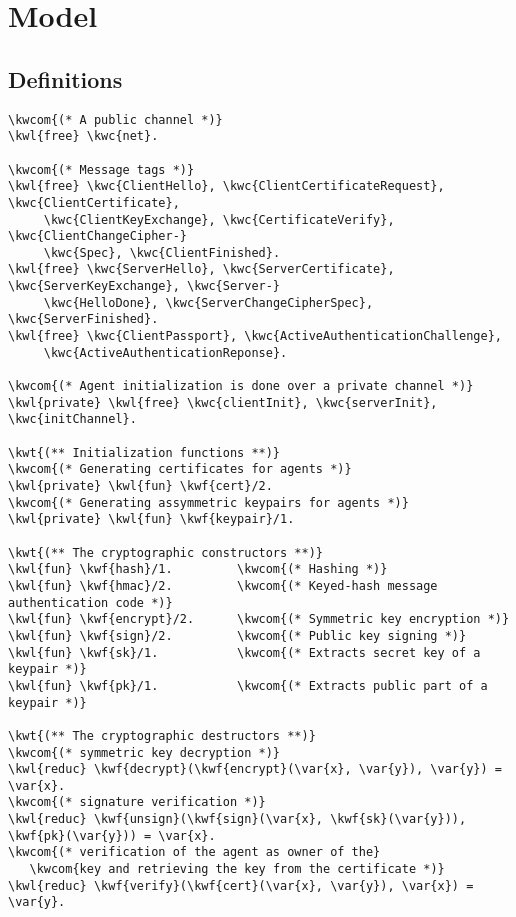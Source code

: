 \chapter{Model}
\label{app:model}

\section{Definitions}
\begin{Verbatim}[commandchars=\\\{\},codes={\catcode`$=3}]
\kwcom{(* A public channel *)}
\kwl{free} \kwc{net}.

\kwcom{(* Message tags *)}
\kwl{free} \kwc{ClientHello}, \kwc{ClientCertificateRequest}, \kwc{ClientCertificate}, 
     \kwc{ClientKeyExchange}, \kwc{CertificateVerify}, \kwc{ClientChangeCipher-}
     \kwc{Spec}, \kwc{ClientFinished}.
\kwl{free} \kwc{ServerHello}, \kwc{ServerCertificate}, \kwc{ServerKeyExchange}, \kwc{Server-}
     \kwc{HelloDone}, \kwc{ServerChangeCipherSpec}, \kwc{ServerFinished}.
\kwl{free} \kwc{ClientPassport}, \kwc{ActiveAuthenticationChallenge}, 
     \kwc{ActiveAuthenticationReponse}.

\kwcom{(* Agent initialization is done over a private channel *)}
\kwl{private} \kwl{free} \kwc{clientInit}, \kwc{serverInit}, \kwc{initChannel}.

\kwt{(** Initialization functions **)}
\kwcom{(* Generating certificates for agents *)}
\kwl{private} \kwl{fun} \kwf{cert}/2.
\kwcom{(* Generating assymmetric keypairs for agents *)}
\kwl{private} \kwl{fun} \kwf{keypair}/1.

\kwt{(** The cryptographic constructors **)}
\kwl{fun} \kwf{hash}/1.         \kwcom{(* Hashing *)}
\kwl{fun} \kwf{hmac}/2.         \kwcom{(* Keyed-hash message authentication code *)}
\kwl{fun} \kwf{encrypt}/2.      \kwcom{(* Symmetric key encryption *)}
\kwl{fun} \kwf{sign}/2.         \kwcom{(* Public key signing *)}
\kwl{fun} \kwf{sk}/1.           \kwcom{(* Extracts secret key of a keypair *)}
\kwl{fun} \kwf{pk}/1.           \kwcom{(* Extracts public part of a keypair *)}

\kwt{(** The cryptographic destructors **)}
\kwcom{(* symmetric key decryption *)}
\kwl{reduc} \kwf{decrypt}(\kwf{encrypt}(\var{x}, \var{y}), \var{y}) = \var{x}.
\kwcom{(* signature verification *)}
\kwl{reduc} \kwf{unsign}(\kwf{sign}(\var{x}, \kwf{sk}(\var{y})), \kwf{pk}(\var{y})) = \var{x}.
\kwcom{(* verification of the agent as owner of the}
   \kwcom{key and retrieving the key from the certificate *)}
\kwl{reduc} \kwf{verify}(\kwf{cert}(\var{x}, \var{y}), \var{x}) = \var{y}.


\end{Verbatim}
